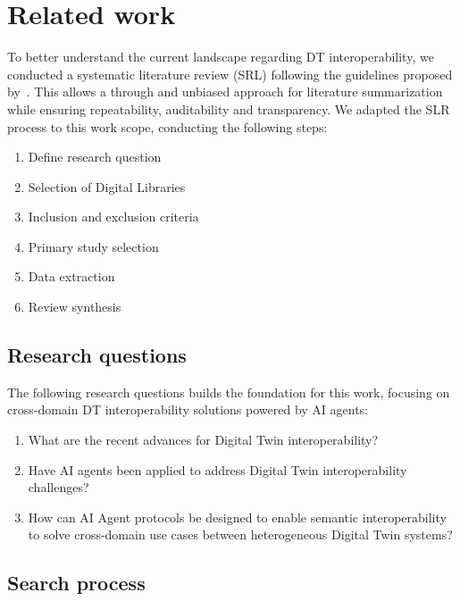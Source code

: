 \chapter{Related work}
\label{chap:related-work}

To better understand the current landscape regarding DT interoperability, we conducted a
    systematic literature review (SRL) following the guidelines proposed by~\cite{kitchenham2007}.
This allows a through and unbiased approach for literature summarization while ensuring
    repeatability, auditability and transparency.
We adapted the SLR process to this work scope, conducting the following steps:

\begin{enumerate}
    \item Define research question
    \item Selection of Digital Libraries
    \item Inclusion and exclusion criteria
    \item Primary study selection
    \item Data extraction
    \item Review synthesis
\end{enumerate}

\section{Research questions}

The following research questions builds the foundation for this work, focusing on
    cross-domain DT interoperability solutions powered by AI agents:

\begin{enumerate}[label=RQ\arabic*:]
    \item \label{rq:digital-twin} What are the recent advances for Digital Twin interoperability?
    \item \label{rq:ai-agents} Have AI agents been applied to address Digital Twin interoperability challenges?
    \item \label{rq:cross-domain} How can AI Agent protocols be designed to 
        enable semantic interoperability to solve
        cross-domain use cases between heterogeneous Digital Twin systems?
\end{enumerate}

\section{Search process}

